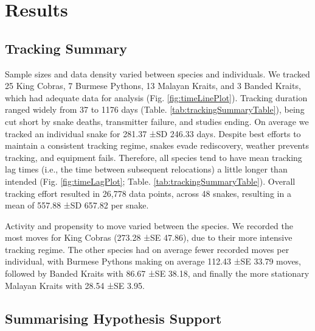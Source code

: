 \documentclass[10pt,a4paper]{article}
\begin{document}
\section{Results}\label{results}

\subsection{Tracking Summary}\label{tracking-summary}

Sample sizes and data density varied between species and individuals.
We tracked 25 King Cobras, 7 Burmese Pythons, 13 Malayan Kraits, and 3 Banded Kraits, which had adequate data for analysis (Fig. \ref{fig:timeLinePlot}).
Tracking duration ranged widely from 37 to 1176 days (Table. \ref{tab:trackingSummaryTable}), being cut short by snake deaths, transmitter failure, and studies ending.
On average we tracked an individual snake for 281.37 ±SD 246.33 days.
Despite best efforts to maintain a consistent tracking regime, snakes evade rediscovery, weather prevents tracking, and equipment fails.
Therefore, all species tend to have mean tracking lag times (i.e., the time between subsequent relocations) a little longer than intended (Fig. \ref{fig:timeLagPlot}; Table. \ref{tab:trackingSummaryTable}).
Overall tracking effort resulted in 26,778 data points, across 48 snakes, resulting in a mean of 557.88 ±SD 657.82 per snake.

Activity and propensity to move varied between the species.
We recorded the most moves for King Cobras (273.28 ±SE 47.86), due to their more intensive tracking regime.
The other species had on average fewer recorded moves per individual, with Burmese Pythons making on average 112.43 ±SE 33.79 moves, followed by Banded Kraits with 86.67 ±SE 38.18, and finally the more stationary Malayan Kraits with 28.54 ±SE 3.95.

\subsection{Summarising Hypothesis Support}\label{summarising-hypothesis-support}
\end{document}
